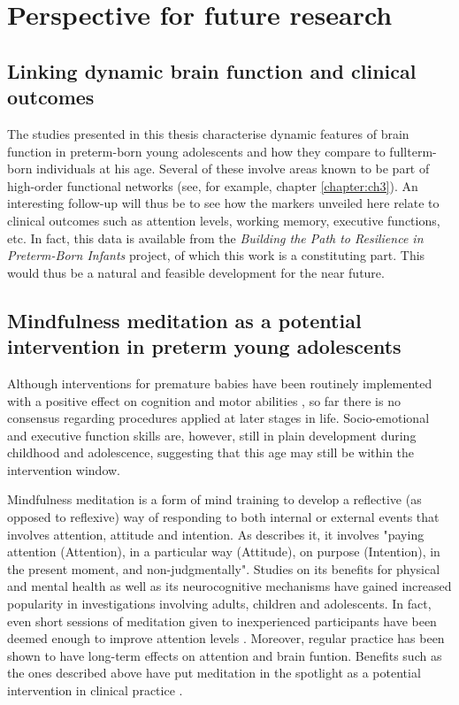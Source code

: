 \section{Perspective for future research}


\subsection*{Linking dynamic brain function and clinical outcomes}
The studies presented in this thesis characterise dynamic features of brain function in preterm-born young adolescents and how they compare to fullterm-born individuals at his age. Several of these involve areas known to be part of high-order functional networks (see, for example, chapter \ref{chapter:ch3}). An interesting follow-up will thus be to see how the markers unveiled here relate to clinical outcomes such as attention levels, working memory, executive functions, etc. In fact, this data is available from the \textit{Building the Path to Resilience in Preterm-Born Infants} project, of which this work is a constituting part. This would thus be a natural and feasible development for the near future.

\subsection*{Mindfulness meditation as a potential intervention in preterm young adolescents}

 Although interventions for premature babies have been routinely implemented with a positive effect on cognition and  motor abilities \citep{Ferreira2020}, so far there is no consensus regarding procedures applied at later stages in life. Socio-emotional and executive function skills are, however, still in plain development during childhood and adolescence, suggesting that this age may still be within the intervention window.


Mindfulness meditation is a form of mind training to develop a reflective (as opposed to reflexive) way of responding to both internal or external events \citep{Bishop2004} that involves attention, attitude and intention. As \citep{Kabat-Zinn1994} describes it, it involves "paying attention (Attention), in a particular way (Attitude), on purpose (Intention), in the present moment, and non-judgmentally". Studies on its benefits for physical and mental health as well as its neurocognitive mechanisms have gained increased popularity in investigations involving adults, children and adolescents. In fact, even short sessions of meditation given to inexperienced participants have been deemed enough to improve attention levels \citet{Norris2018, Jankowski2020}. Moreover, regular practice has been shown to have long-term effects on attention \citep{Zanesco2018} and brain funtion. Benefits such as the ones described above have put meditation in the spotlight as a potential intervention in clinical practice \citep{Simkin2014,Zhang2018}.

